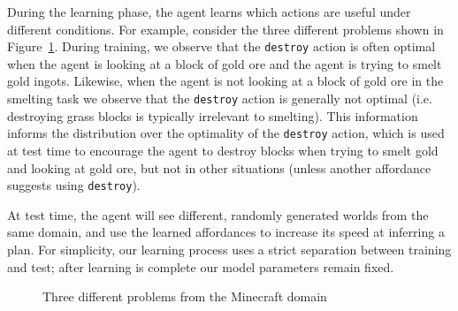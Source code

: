 \documentclass[letterpaper]{article}
\begin{document}
During the learning phase, the agent learns which actions are useful
under different conditions.  For example, consider the three different
problems shown in Figure~\ref{fig:minecraft}.  During training, we observe
that the \texttt{destroy} action is often optimal when the agent is
looking at a block of gold ore and the agent is trying to smelt gold
ingots.  Likewise, when the agent is not looking at a block of gold
ore in the smelting task we observe that the \texttt{destroy} action
is generally not optimal (i.e. destroying grass blocks is typically
irrelevant to smelting).  This information informs the distribution
over the optimality of the \texttt{destroy} action, which is used at
test time to encourage the agent to destroy blocks when trying to
smelt gold and looking at gold ore, but not in other situations
(unless another affordance suggests using \texttt{destroy}).

At test time, the agent will see different, randomly generated worlds
from the same domain, and use the learned affordances to increase its
speed at inferring a plan.  For simplicity, our learning process uses
a strict separation between training and test; after learning is
complete our model parameters remain fixed. 


\begin{figure}
\centering
{}
  \caption{Three different problems from the Minecraft domain}
  \label{fig:minecraft}
\end{figure}
\end{document}
